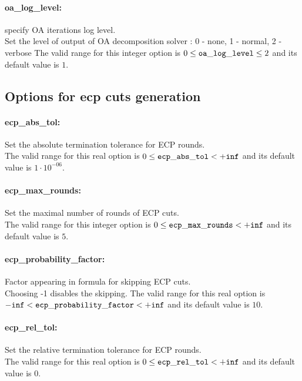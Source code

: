 \paragraph{\bf oa\_log\_level:}\label{sec:oa_log_level} specify OA iterations log level. $\;$ \\
 Set the level of output of OA decomposition
solver : 0 - none, 1 - normal, 2 - verbose The valid range for this integer option is
$0 \le {\tt oa\_log\_level } \le 2$
and its default value is $1$.


\subsection{Options for ecp cuts generation}
\label{sec:Options_for_ecp_cuts_generation}
\paragraph{\bf ecp\_abs\_tol:}\label{sec:ecp_abs_tol} Set the absolute termination tolerance for ECP rounds. $\;$ \\
 The valid range for this real option is 
$0 \le {\tt ecp\_abs\_tol } <  {\tt +inf}$
and its default value is $1 \cdot 10^{-06}$.


\paragraph{\bf ecp\_max\_rounds:}\label{sec:ecp_max_rounds} Set the maximal number of rounds of ECP cuts. $\;$ \\
 The valid range for this integer option is
$0 \le {\tt ecp\_max\_rounds } <  {\tt +inf}$
and its default value is $5$.


\paragraph{\bf ecp\_probability\_factor:}\label{sec:ecp_probability_factor} Factor appearing in formula for skipping ECP cuts. $\;$ \\
 Choosing -1 disables the skipping. The valid range for this real option is 
${\tt -inf} <  {\tt ecp\_probability\_factor } <  {\tt +inf}$
and its default value is $10$.


\paragraph{\bf ecp\_rel\_tol:}\label{sec:ecp_rel_tol} Set the relative termination tolerance for ECP rounds. $\;$ \\
 The valid range for this real option is 
$0 \le {\tt ecp\_rel\_tol } <  {\tt +inf}$
and its default value is $0$.


